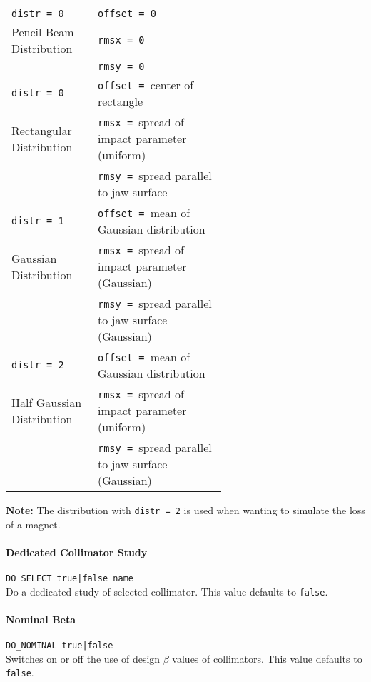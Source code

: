\bigskip
\begin{tabular}{@{}l|p{0.6\linewidth}}
    \texttt{distr = 0}         & \texttt{offset = 0} \\
    Pencil Beam Distribution   & \texttt{rmsx   = 0} \\
                               & \texttt{rmsy   = 0} \\
    \hline
    \texttt{distr = 0}         & \texttt{offset = }center of rectangle \\
    Rectangular Distribution   & \texttt{rmsx   = }spread of impact parameter (uniform) \\
                               & \texttt{rmsy   = }spread parallel to jaw surface \\
    \hline
    \texttt{distr = 1}         & \texttt{offset = }mean of Gaussian distribution \\
    Gaussian Distribution      & \texttt{rmsx   = }spread of impact parameter (Gaussian) \\
                               & \texttt{rmsy   = }spread parallel to jaw surface (Gaussian) \\
    \hline
    \texttt{distr = 2}         & \texttt{offset = }mean of Gaussian distribution \\
    Half Gaussian Distribution & \texttt{rmsx   = }spread of impact parameter (uniform) \\
                               & \texttt{rmsy   = }spread parallel to jaw surface (Gaussian) \\
\end{tabular}

\bigskip
\noindent\textbf{Note:} The distribution with \texttt{distr = 2} is used when wanting to simulate the loss of a magnet.

\paragraph{Dedicated Collimator Study} \texttt{DO\_SELECT true|false name}\\

Do a dedicated study of selected collimator.
This value defaults to \texttt{false}.

\paragraph{Nominal Beta} \texttt{DO\_NOMINAL true|false}\\

Switches on or off the use of design $\beta$ values of collimators.
This value defaults to \texttt{false}.

